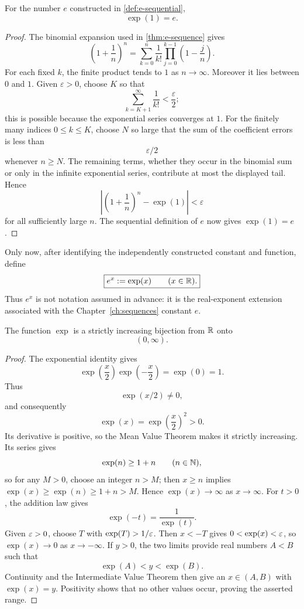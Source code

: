 \begin{theorem}
\label{thm:exp-one-e}
For the number \(e\) constructed in \cref{def:e-sequential},
\[
\boxed{\exp(1)=e.}
\]
\end{theorem}
\begin{proof}
The binomial expansion used in \cref{thm:e-sequence} gives
\[
\left(1+\frac1n\right)^n
=\sum_{k=0}^{n}\frac1{k!}
  \prod_{j=0}^{k-1}\left(1-\frac jn\right).
\]
For each fixed \(k\), the finite product tends to \(1\) as
\(n\to\infty\). Moreover it lies between \(0\) and \(1\). Given
\(\varepsilon>0\), choose \(K\) so that
\[
\sum_{k=K+1}^{\infty}\frac1{k!}<\frac{\varepsilon}{2};
\]
this is possible because the exponential series converges at \(1\). For
the finitely many indices \(0\leq k\leq K\), choose \(N\) so large that
the sum of the coefficient errors is less than
\[
\varepsilon/2
\]
 whenever
\(n\geq N\). The remaining terms, whether they occur in the binomial sum
or only in the infinite exponential series, contribute at most the displayed
tail. Hence
\[
\left|\left(1+\frac1n\right)^n-\exp(1)\right|<\varepsilon
\]
for all sufficiently large \(n\). The sequential definition of \(e\) now
gives \(\exp(1)=e\).
\end{proof}

\begin{definition}
Only now, after identifying the independently constructed constant and
function, define
\[
\boxed{e^x:=\exp(x)\qquad(x\in\mathbb{R}).}
\]
Thus \(e^x\) is not notation assumed in advance: it is the real-exponent
extension associated with the Chapter~\ref{ch:sequences} constant \(e\).
\end{definition}

\begin{theorem}
\label{thm:exponential-bijection}
The function $\exp$ is a strictly increasing bijection from $\mathbb{R}$ onto
\[
(0,\infty).
\]
\end{theorem}
\begin{proof}
The exponential identity gives
\[
\exp\left(\frac x2\right)\exp\left(-\frac x2\right)=\exp(0)=1.
\]
Thus
\[
\exp(x/2)\ne0,
\]
 and consequently
\[
\exp(x)=\exp\left(\frac x2\right)^2>0.
\]
Its derivative is positive, so the Mean Value Theorem makes it strictly increasing. Its series gives
\[
\exp(n)\geq1+n
\qquad(n\in\mathbb{N}),
\]
so for any $M>0$, choose an integer $n>M$; then $x\geq n$ implies
$\exp(x)\geq\exp(n)\geq1+n>M$. Hence $\exp(x)\to\infty$ as
$x\to\infty$. For $t>0$, the addition law gives
\[
\exp(-t)=\frac{1}{\exp(t)}.
\]
Given $\varepsilon>0$, choose $T$ with $\exp(T)>1/\varepsilon$. Then $x<-T$ gives
$0<\exp(x)<\varepsilon$, so $\exp(x)\to0$ as $x\to-\infty$. If $y>0$, the two
limits provide real numbers $A<B$ such that
\[
\exp(A)<y<\exp(B).
\]
Continuity and the Intermediate Value Theorem then give an $x\in(A,B)$ with $\exp(x)=y$. Positivity shows that no other values occur, proving the asserted range.
\end{proof}


